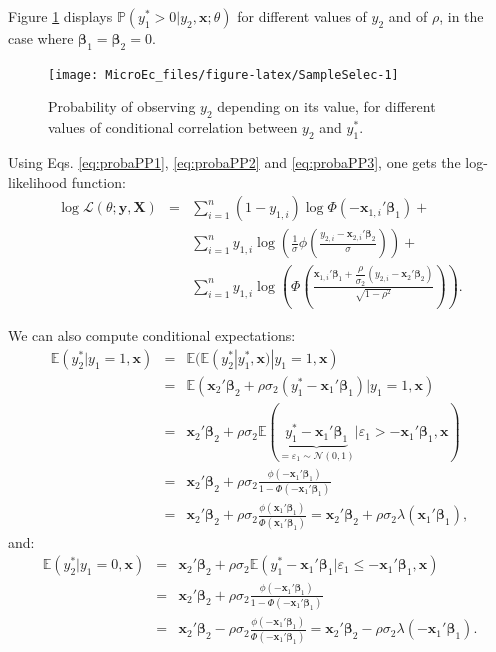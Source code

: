 \documentclass[
  12pt,
]{book}
\theoremstyle{definition}
\theoremstyle{definition}
\theoremstyle{definition}
\theoremstyle{definition}
\theoremstyle{remark}
\begin{document}
Figure \ref{fig:SampleSelec} displays \(\mathbb{P}(y_1^*>0|y_2,\mathbf{x};\theta)\) for different values of \(y_2\) and of \(\rho\), in the case where \(\boldsymbol\beta_1=\boldsymbol\beta_2=0\).

\begin{figure}
\texttt{[image: MicroEc\_files/figure-latex/SampleSelec-1]} \caption{Probability of observing $y_2$ depending on its value, for different values of conditional correlation between $y_2$ and $y_1^*$.}\label{fig:SampleSelec}
\end{figure}

Using Eqs. \eqref{eq:probaPP1}, \eqref{eq:probaPP2} and \eqref{eq:probaPP3}, one gets the log-likelihood function:
\begin{eqnarray*}
\log \mathcal{L}(\theta;\mathbf{y},\mathbf{X}) &=& \sum_{i=1}^n  (1 - y_{1,i})\log \Phi(-\mathbf{x}_{1,i}'\boldsymbol\beta_1) + \\
&&  \sum_{i=1}^n y_{1,i} \log \left(  \frac{1}{\sigma}\phi\left(\frac{y_{2,i} - \mathbf{x}_{2,i}'\boldsymbol\beta_2}{\sigma}\right)\right) + \\
&&  \sum_{i=1}^n y_{1,i} \log \left(\Phi\left( \frac{\mathbf{x}_{1,i}'\boldsymbol\beta_1 + \dfrac{\rho}{\sigma_2}(y_{2,i}-\mathbf{x}_2'\boldsymbol\beta_2)}{\sqrt{1-\rho^2}}\right)\right).
\end{eqnarray*}

We can also compute conditional expectations:
\begin{eqnarray}
\mathbb{E}(y_2^*|y_1=1,\mathbf{x}) &=& \mathbb{E}(\mathbb{E}(y_2^*|y_1^*,\mathbf{x})|y_1=1,\mathbf{x})\nonumber\\
&=& \mathbb{E}(\mathbf{x}_2'\boldsymbol\beta_2 + \rho\sigma_2(y_1^*-\mathbf{x}_1'\boldsymbol\beta_1)|y_1=1,\mathbf{x})\nonumber\\
&=& \mathbf{x}_2'\boldsymbol\beta_2 + \rho\sigma_2\mathbb{E}( \underbrace{y_1^*-\mathbf{x}_1'\boldsymbol\beta_1}_{=\varepsilon_1 \sim\mathcal{N}(0,1)}|\varepsilon_1>-\mathbf{x}_1'\boldsymbol\beta_1,\mathbf{x})\nonumber\\
&=& \mathbf{x}_2'\boldsymbol\beta_2 + \rho\sigma_2\frac{\phi(-\mathbf{x}_1'\boldsymbol\beta_1)}{1 - \Phi(-\mathbf{x}_1'\boldsymbol\beta_1)}\nonumber\\
&=& \mathbf{x}_2'\boldsymbol\beta_2 + \rho\sigma_2\frac{\phi(\mathbf{x}_1'\boldsymbol\beta_1)}{\Phi(\mathbf{x}_1'\boldsymbol\beta_1)}=\mathbf{x}_2'\boldsymbol\beta_2 + \rho\sigma_2\lambda(\mathbf{x}_1'\boldsymbol\beta_1),\label{eq:y2y11}
\end{eqnarray}
and:
\begin{eqnarray*}
\mathbb{E}(y_2^*|y_1=0,\mathbf{x}) &=&  \mathbf{x}_2'\boldsymbol\beta_2 + \rho\sigma_2\mathbb{E}(y_1^*-\mathbf{x}_1'\boldsymbol\beta_1|\varepsilon_1\le-\mathbf{x}_1'\boldsymbol\beta_1,\mathbf{x})\\
&=& \mathbf{x}_2'\boldsymbol\beta_2 + \rho\sigma_2\frac{\phi(-\mathbf{x}_1'\boldsymbol\beta_1)}{1 - \Phi(-\mathbf{x}_1'\boldsymbol\beta_1)}\\
&=& \mathbf{x}_2'\boldsymbol\beta_2 - \rho\sigma_2\frac{\phi(-\mathbf{x}_1'\boldsymbol\beta_1)}{\Phi(-\mathbf{x}_1'\boldsymbol\beta_1)}=\mathbf{x}_2'\boldsymbol\beta_2 - \rho\sigma_2\lambda(-\mathbf{x}_1'\boldsymbol\beta_1).
\end{eqnarray*}
\end{document}
